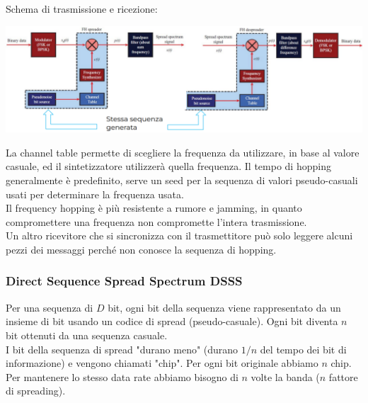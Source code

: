 Schema di trasmissione e ricezione:
\begin{center}
	\includegraphics[width=\linewidth]{img/wireless/fhss1}
\end{center}
La channel table permette di scegliere la frequenza da utilizzare, in base al valore casuale, ed il sintetizzatore utilizzerà quella frequenza. Il tempo di hopping generalmente è predefinito, serve un seed per la sequenza di valori pseudo-casuali usati per determinare la frequenza usata.\\

Il frequency hopping è più resistente a rumore e jamming, in quanto compromettere una frequenza non compromette l'intera trasmissione.\\
Un altro ricevitore che si sincronizza con il trasmettitore può solo leggere alcuni pezzi dei messaggi perché non conosce la sequenza di hopping. \\

\newpage

\subsubsection{Direct Sequence Spread Spectrum DSSS}

Per una sequenza di $D$ bit, ogni bit della sequenza viene rappresentato da un insieme di bit usando un codice di spread (pseudo-casuale). Ogni bit diventa $n$ bit ottenuti da una sequenza casuale. \\
I bit della sequenza di spread "durano meno" (durano $1/n$ del tempo dei bit di informazione) e vengono chiamati "chip". Per ogni bit originale abbiamo $n$ chip.\\
Per mantenere lo stesso data rate abbiamo bisogno di $n$ volte la banda ($n$ fattore di spreading).\\

